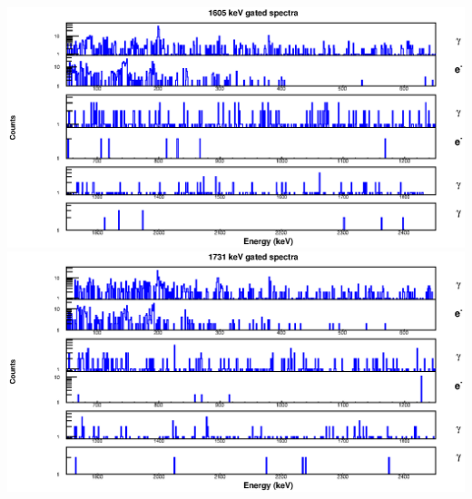 \begin{landscape}
\includegraphics[scale=1.2]{156Gd_Appendix/1605_combined.eps}
\includegraphics[scale=1.2]{156Gd_Appendix/1731_combined.eps}
\end{landscape}